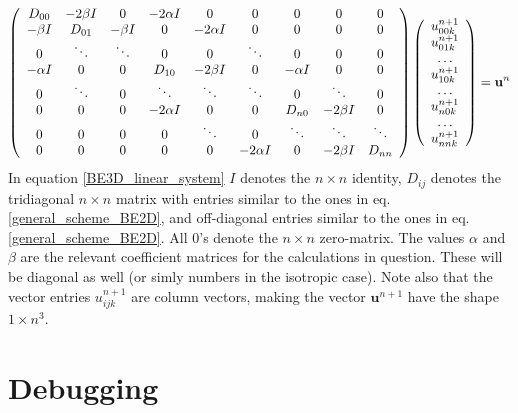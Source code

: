 \begin{align}\label{BE3D_linear_system}
  \left(\begin{array}{c c c c c c c c c}
        D_{00} & -2\beta I &0 &-2\alpha I &0 &0 &0 &0 &0\\
        -\beta I & D_{01} & -\beta I &0 &-2\alpha I &0 &0 &0 &0\\
        0&\ddots & \ddots & 0 & 0 & \ddots &0&0&0\\
        -\alpha I& 0&0 & D_{10} & -2\beta I& 0 & -\alpha I &0&0\\
        0& \ddots&0&\ddots & \ddots & \ddots & 0 & \ddots &0\\
        0& 0 &0 &-2\alpha I &0&0 & D_{n0} & -2\beta I&0\\
        0& 0 &0 &0 &\ddots&0&\ddots & \ddots &\ddots\\
         0&0 &0 &0&0 &-2\alpha I&0&-2\beta I & D_{nn}
       \end{array}\right)
       \left(\begin{array}{c}
             u^{n+1}_{00k}\\
             u^{n+1}_{01k}\\
             \dots\\
             u^{n+1}_{10k}\\
             \dots\\
             u^{n+1}_{n0k}\\
             \dots\\
             u^{n+1}_{nnk}
             \end{array}\right) = \mathbf{u}^{n}
\end{align}
In equation \ref{BE3D_linear_system} $I$ denotes the $n\times n$ identity, $D_{ij}$ denotes the tridiagonal $n\times n$ matrix with entries similar to the ones in eq. \ref{general_scheme_BE2D}, and off-diagonal entries similar to the ones in eq. \ref{general_scheme_BE2D}. 
All $0$'s denote the $n\times n$ zero-matrix. The values $\alpha$ and $\beta$ are the relevant coefficient matrices for the calculations in question. These will be diagonal as well (or simly numbers in the isotropic case). 
Note also that the vector entries $u^{n+1}_{ijk}$ are column vectors, making the vector $\mathbf{u}^{n+1}$ have the shape $1\times n^3$.


\section{Debugging}

